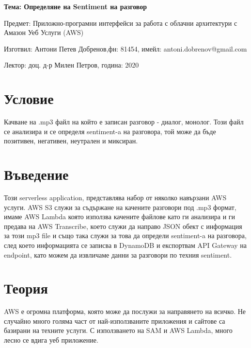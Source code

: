 \documentclass[12pt]{article}
\begin{document}
	\begin{center}
        \LARGE{\textbf{Тема: Определяне на Sentiment на разговор}}
        
        \bigskip
        \Large{Предмет: Приложно-програмни интерфейси за работа с облачни архитектури с Амазон Уеб Услуги (AWS)}
        
        \medskip
        \Large{Изготвил: Антони Петев Добренов,фн: 81454, имейл: antoni.dobrenov@gmail.com}
        
        \medskip
        \Large{Лектор: доц. д-р Милен Петров, година: 2020}
        
        \bigskip
	\end{center}
    
    
    \tableofcontents
    \bigskip
    \bigskip
    \newpage
  
\section{Условие} 


\medskip

\noindent Качване на .mp3 файл на който е записан разговор - диалог, монолог. Този файл се анализира и се определя sentiment-a на разговора, той може да бъде позитивен, негативен, неутрален и миксиран.

\section{Въведение}

Този serverless application, представлява набор от няколко навързани AWS услуги. AWS S3 служи за съдържане на качените разговори под .mp3 формат, имаме AWS Lambda която използва качените файлове като ги анализира и ги предава на AWS Transcribe, което служи да направо JSON обект с информация за този mp3 file и също така служи за това да определи sentiment-a на разговора, след което информацията се записва в DynamoDB и експортвам API Gateway на endpoint, като можем да извличаме данни за разговори по техния sentiment.

\section{Теория}

AWS е огромна платформа, която може да послужи за направянето на всичко. Не случайно много голяма част от най-използваните приложения и сайтове са базирани на техните услуги. С използването на SAM и AWS Lambda, много лесно се вдига уеб приложение.
\end{document}
